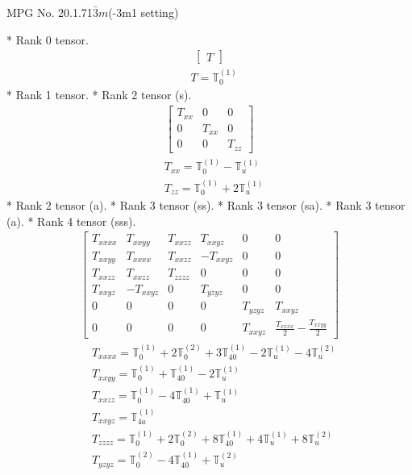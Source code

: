 \documentclass[fleqn,8pt,landscape]{jsarticle}
\begin{document}
\setcounter{MaxMatrixCols}{32}

\renewcommand{\tablename}{Table~}
\renewcommand{\figurename}{Figure~}
\begin{center}
\LARGE
MPG No. 20.1.71\quad$\bar{3}m$\quad(-3m1 setting)
\end{center}
* Rank 0 tensor.
\begin{align*}
\begin{bmatrix} T \end{bmatrix}
\end{align*}
\begin{align*}
& T = \mathbb{T}_{0}^{(1)}
\end{align*}
* Rank 1 tensor.
* Rank 2 tensor (s).
\begin{align*}
\begin{bmatrix} T_{xx} & 0 & 0 \\ 0 & T_{xx} & 0 \\ 0 & 0 & T_{zz} \end{bmatrix}
\end{align*}
\begin{align*}
& T_{xx} = \mathbb{T}_{0}^{(1)} - \mathbb{T}_{u}^{(1)} \\
& T_{zz} = \mathbb{T}_{0}^{(1)} + 2 \mathbb{T}_{u}^{(1)}
\end{align*}
* Rank 2 tensor (a).
* Rank 3 tensor (ss).
* Rank 3 tensor (sa).
* Rank 3 tensor (a).
* Rank 4 tensor (sss).
\begin{align*}
\begin{bmatrix} T_{xxxx} & T_{xxyy} & T_{xxzz} & T_{xxyz} & 0 & 0 \\ T_{xxyy} & T_{xxxx} & T_{xxzz} & - T_{xxyz} & 0 & 0 \\ T_{xxzz} & T_{xxzz} & T_{zzzz} & 0 & 0 & 0 \\ T_{xxyz} & - T_{xxyz} & 0 & T_{yzyz} & 0 & 0 \\ 0 & 0 & 0 & 0 & T_{yzyz} & T_{xxyz} \\ 0 & 0 & 0 & 0 & T_{xxyz} & \frac{T_{xxxx}}{2} - \frac{T_{xxyy}}{2} \end{bmatrix}
\end{align*}
\begin{align*}
& T_{xxxx} = \mathbb{T}_{0}^{(1)} + 2 \mathbb{T}_{0}^{(2)} + 3 \mathbb{T}_{40}^{(1)} - 2 \mathbb{T}_{u}^{(1)} - 4 \mathbb{T}_{u}^{(2)} \\
& T_{xxyy} = \mathbb{T}_{0}^{(1)} + \mathbb{T}_{40}^{(1)} - 2 \mathbb{T}_{u}^{(1)} \\
& T_{xxzz} = \mathbb{T}_{0}^{(1)} - 4 \mathbb{T}_{40}^{(1)} + \mathbb{T}_{u}^{(1)} \\
& T_{xxyz} = \mathbb{T}_{4a}^{(1)} \\
& T_{zzzz} = \mathbb{T}_{0}^{(1)} + 2 \mathbb{T}_{0}^{(2)} + 8 \mathbb{T}_{40}^{(1)} + 4 \mathbb{T}_{u}^{(1)} + 8 \mathbb{T}_{u}^{(2)} \\
& T_{yzyz} = \mathbb{T}_{0}^{(2)} - 4 \mathbb{T}_{40}^{(1)} + \mathbb{T}_{u}^{(2)}
\end{align*}
\end{document}
